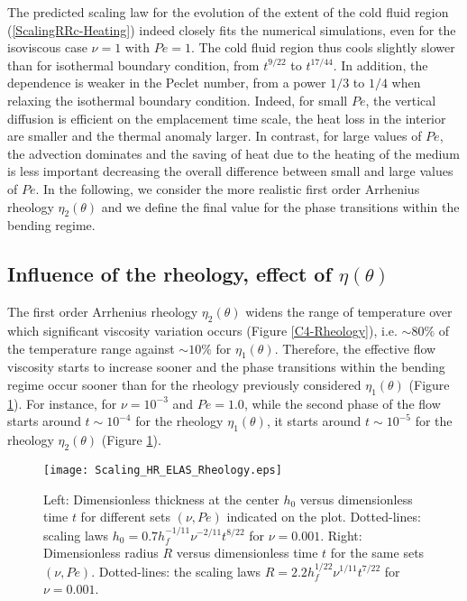 The predicted scaling law for the  evolution of the extent of the cold
fluid  region  (\ref{ScalingRRc-Heating})   indeed  closely  fits  the
numerical  simulations,  even for  the  isoviscous  case $\nu=1$  with
$Pe=1$.  The  cold fluid  region thus cools  slightly slower  than for
isothermal  boundary condition,  from $t^{9/22}$  to $t^{17/44}$.   In
addition, the dependence is weaker in  the Peclet number, from a power
$1/3$    to   $1/4$    when   relaxing    the   isothermal    boundary
condition. Indeed, for small $Pe$, the vertical diffusion is efficient
on  the emplacement  time scale,  the heat  loss in  the interior  are
smaller and the thermal anomaly  larger. In contrast, for large values
of $Pe$,  the advection dominates  and the saving  of heat due  to the
heating  of  the  medium  is less  important  decreasing  the  overall
difference between small and large  values of $Pe$.  In the following,
we  consider  the  more   realistic  first  order  Arrhenius  rheology
$\eta_2(\theta)$  and  we  define  the   final  value  for  the  phase
transitions within the bending regime.

\subsection{Influence of the rheology, effect of $\eta(\theta)$}
\label{sec:infl-therm-bound}

The first  order Arrhenius rheology $\eta_2(\theta)$  widens the range
of  temperature  over  which significant  viscosity  variation  occurs
(Figure \ref{C4-Rheology}), i.e.  $\sim80\%$  of the temperature range
against $\sim10\%$ for $\eta_1(\theta)$. Therefore, the effective flow
viscosity starts to  increase sooner and the  phase transitions within
the  bending regime  occur  sooner than  for  the rheology  previously
considered  $\eta_1(\theta)$ (Figure  \ref{Scaling_HR_ELAS_Rheology}).
For instance, for  $\nu=10^{-3}$ and $Pe=1.0$, while  the second phase
of  the   flow  starts  around   $t\sim  10^{-4}$  for   the  rheology
$\eta_1(\theta)$, it  starts around  $t\sim 10^{-5}$ for  the rheology
$\eta_2(\theta)$ (Figure \ref{Scaling_HR_ELAS_Rheology}).

\begin{figure}
  \begin{center}
    \graphicspath{ {/Users/thorey/Documents/These/Projet/Refroidissement/Skin_Model/Figure/Figure_Heating/} }
    \texttt{[image: Scaling\_HR\_ELAS\_Rheology.eps]}
    \caption{Left: Dimensionless thickness at  the center $h_0$ versus
      dimensionless time  $t$ for different sets  $(\nu,Pe)$ indicated
      on      the      plot.      Dotted-lines:      scaling      laws
      $h_0=  0.7h_f^{-1/11}\nu^{-2/11}t^{8/22}$  for  $\nu  =  0.001$.
      Right: Dimensionless  radius $R$  versus dimensionless  time $t$
      for the  same sets  $(\nu,Pe)$.  Dotted-lines: the  scaling laws
      $R= 2.2h_f^{1/22}\nu^{1/11}t^{7/22}$ for $\nu=0.001$.}
    \label{Scaling_HR_ELAS_Rheology}
  \end{center}
\end{figure}


